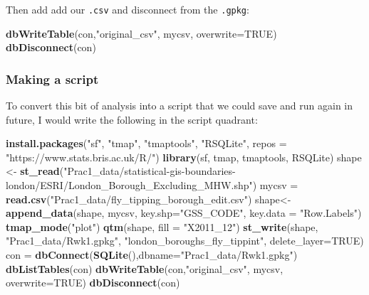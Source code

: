 \documentclass[]{book}
\newenvironment{Shaded}{\begin{snugshade}}{\end{snugshade}}
\newcommand{\DataTypeTok}[1]{\textcolor[rgb]{0.13,0.29,0.53}{#1}}
\newcommand{\KeywordTok}[1]{\textcolor[rgb]{0.13,0.29,0.53}{\textbf{#1}}}
\newcommand{\NormalTok}[1]{#1}
\newcommand{\OtherTok}[1]{\textcolor[rgb]{0.56,0.35,0.01}{#1}}
\newcommand{\StringTok}[1]{\textcolor[rgb]{0.31,0.60,0.02}{#1}}
\begin{document}
Then add add our \texttt{.csv} and disconnect from the \texttt{.gpkg}:

\begin{Shaded}
\begin{Highlighting}[]
\KeywordTok{dbWriteTable}\NormalTok{(con,}\StringTok{"original_csv"}\NormalTok{, mycsv, }\DataTypeTok{overwrite=}\OtherTok{TRUE}\NormalTok{)}
\KeywordTok{dbDisconnect}\NormalTok{(con)}
\end{Highlighting}
\end{Shaded}

\hypertarget{making-a-script}{%
\subsubsection{Making a script}\label{making-a-script}}

To convert this bit of analysis into a script that we could save and run again in future, I would write the following in the script quadrant:

\begin{Shaded}
\begin{Highlighting}[]
\KeywordTok{install.packages}\NormalTok{(}\StringTok{"sf"}\NormalTok{, }\StringTok{"tmap"}\NormalTok{, }\StringTok{"tmaptools"}\NormalTok{, }\StringTok{"RSQLite"}\NormalTok{, }\DataTypeTok{repos =} \StringTok{"https://www.stats.bris.ac.uk/R/"}\NormalTok{)}
\KeywordTok{library}\NormalTok{(sf, tmap, tmaptools, RSQLite)}
\NormalTok{shape <-}\StringTok{ }\KeywordTok{st_read}\NormalTok{(}\StringTok{"Prac1_data/statistical-gis-boundaries-london/ESRI/London_Borough_Excluding_MHW.shp"}\NormalTok{)}
\NormalTok{mycsv =}\StringTok{ }\KeywordTok{read.csv}\NormalTok{(}\StringTok{"Prac1_data/fly_tipping_borough_edit.csv"}\NormalTok{)  }
\NormalTok{shape<-}\KeywordTok{append_data}\NormalTok{(shape, mycsv, }\DataTypeTok{key.shp=}\StringTok{"GSS_CODE"}\NormalTok{, }\DataTypeTok{key.data =} \StringTok{"Row.Labels"}\NormalTok{)}
\KeywordTok{tmap_mode}\NormalTok{(}\StringTok{"plot"}\NormalTok{)}
\KeywordTok{qtm}\NormalTok{(shape, }\DataTypeTok{fill =} \StringTok{"X2011_12"}\NormalTok{)}
\KeywordTok{st_write}\NormalTok{(shape, }\StringTok{"Prac1_data/Rwk1.gpkg"}\NormalTok{, }\StringTok{"london_boroughs_fly_tippint"}\NormalTok{, }\DataTypeTok{delete_layer=}\OtherTok{TRUE}\NormalTok{)}
\NormalTok{con =}\StringTok{ }\KeywordTok{dbConnect}\NormalTok{(}\KeywordTok{SQLite}\NormalTok{(),}\DataTypeTok{dbname=}\StringTok{"Prac1_data/Rwk1.gpkg"}\NormalTok{)}
\KeywordTok{dbListTables}\NormalTok{(con)}
\KeywordTok{dbWriteTable}\NormalTok{(con,}\StringTok{"original_csv"}\NormalTok{, mycsv, }\DataTypeTok{overwrite=}\OtherTok{TRUE}\NormalTok{)}
\KeywordTok{dbDisconnect}\NormalTok{(con)}
\end{Highlighting}
\end{Shaded}
\end{document}

